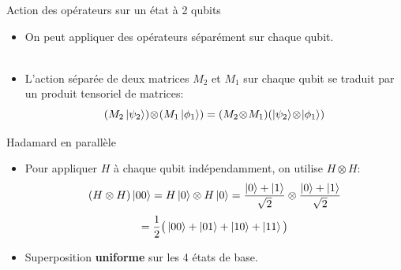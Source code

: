 \documentclass[aspectratio=169,12pt]{beamer}
\begin{document}
\begin{frame}{Action des opérateurs sur un état à 2 qubits}
  \begin{itemize}[<+->]
    \item On peut appliquer des opérateurs séparément sur chaque qubit.
    \\~\\
    \item L'action séparée de deux matrices $M_2$ et $M_1$ sur chaque qubit se traduit par un produit tensoriel de matrices:
    \[
      (M_2\ket{\psi_2})\!\otimes\!(M_1\ket{\phi_1}) = (M_2\!\otimes\! M_1)(\ket{\psi_2}\!\otimes\!\ket{\phi_1})
    \]
  \end{itemize}
\end{frame}

\begin{frame}{Hadamard en parallèle}
  \begin{itemize}[<+->]
    \setlength{\itemsep}{0.55em}
    \item Pour appliquer $H$ à chaque qubit indépendamment, on utilise $H\otimes H$:
    $$(H\otimes H)\ket{00} = H\ket{0}\otimes H\ket{0}
     = \frac{\ket{0}+\ket{1}}{\sqrt{2}}\otimes\frac{\ket{0}+\ket{1}}{\sqrt{2}}$$
    $$= \frac{1}{2}\big(\ket{00}+\ket{01}+\ket{10}+\ket{11}\big)$$
    \item Superposition \textbf{uniforme} sur les 4 états de base.
  \end{itemize}
\end{frame}
\end{document}
